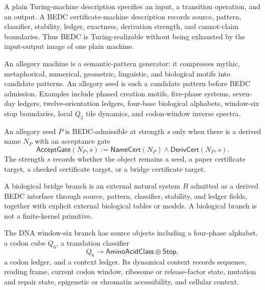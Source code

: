 \begin{definition}
\label{def:philosophy-plain-turing-machine-certificate-machine}
A plain Turing-machine description specifies an input, a transition
operation, and an output. A BEDC certificate-machine description records
source, pattern, classifier, stability, ledger, exactness, derivation
strength, and cannot-claim boundaries. Thus BEDC is Turing-realizable
without being exhausted by the input-output image of one plain machine.
\end{definition}

\begin{definition}
\label{def:philosophy-allegory-machine-seed}
An allegory machine is a semantic-pattern generator: it compresses
mythic, metaphorical, numerical, geometric, linguistic, and biological
motifs into candidate patterns. An allegory seed is such a candidate
pattern before BEDC admission. Examples include phased creation motifs,
five-phase systems, seven-day ledgers, twelve-orientation ledgers,
four-base biological alphabets, window-six stop boundaries, local
$Q_{2}$ tile dynamics, and codon-window inverse spectra.
\end{definition}

\begin{definition}
\label{def:philosophy-allegory-seed-admission}
An allegory seed $P$ is BEDC-admissible at strength $s$ only when there
is a derived name $N_{P}$ with an acceptance gate
$$
  \mathsf{AcceptGate}(N_{P},s)
  :=
  \mathsf{NameCert}(N_{P})\wedge\mathsf{DerivCert}(N_{P},s).
$$
The strength $s$ records whether the object remains a seed, a paper
certificate target, a checked certificate target, or a bridge certificate
target.
\end{definition}

\begin{definition}
\label{def:philosophy-biological-bridge-branch}
A biological bridge branch is an external natural system $B$ admitted as
a derived BEDC interface through source, pattern, classifier, stability,
and ledger fields, together with explicit external biological tables or
models. A biological branch is not a finite-kernel primitive.
\end{definition}

\begin{definition}
\label{def:philosophy-dna-window-six-biological-branch}
The DNA window-six branch has source objects including a four-phase
alphabet, a codon cube $Q_{6}$, a translation classifier
$$
  Q_{6}\to\mathsf{AminoAcidClass}\oplus\mathsf{Stop},
$$
a codon ledger, and a context ledger. Its dynamical context records
sequence, reading frame, current codon window, ribosome or release-factor
state, mutation and repair state, epigenetic or chromatin accessibility,
and cellular context.
\end{definition}

